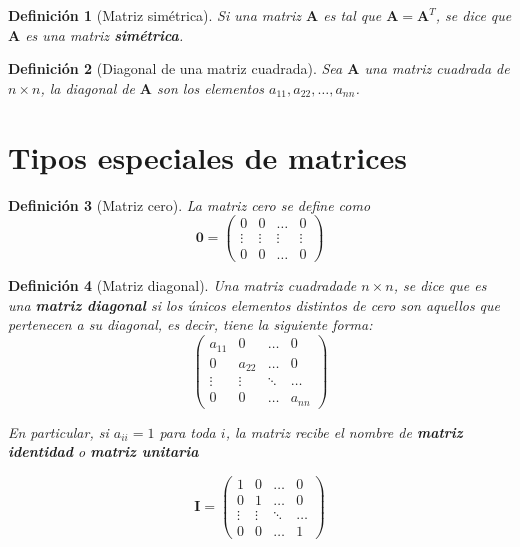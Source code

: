 \documentclass[11pt]{report}
\theoremstyle{break}
\newtheorem{definicion}{Definición}[chapter]
\theoremstyle{break}
\newcommand{\matdim}[2]{$#1 \times #2$}
\begin{document}
\begin{definicion}[Matriz simétrica]
\label{definicion:matriz-simetrica}
Si una matriz $\bm{A}$ es tal que $\bm{A} = \bm{A}^T$, se dice que $\bm{A}$ es una matriz \textbf{simétrica}.
\end{definicion}

\begin{definicion}[Diagonal de una matriz cuadrada]
\label{definicion:diagonal}
Sea $\bm{A}$ una matriz cuadrada de \matdim{n}{n}, la diagonal de $\bm{A}$ son los elementos $a_{11}, a_{22}, \ldots, a_{nn}$.
\end{definicion}

\section{Tipos especiales de matrices}
\label{seccion:Tipos-matrices}
\begin{definicion}[Matriz cero]
\label{definicion:matriz-cero}
La matriz cero se define como
$$
\bm{0} = 
\begin{pmatrix}
0 & 0 & \ldots & 0 \\
\vdots & \vdots & \vdots & \vdots \\
0 & 0 & \ldots & 0
\end{pmatrix}
$$
\end{definicion}

\begin{definicion}[Matriz diagonal]
\label{definicion:matriz-diagonal}
Una matriz cuadradade \matdim{n}{n}, se dice que es una \textbf{matriz diagonal} si los únicos elementos distintos de cero son aquellos que pertenecen a su diagonal, es decir, tiene la siguiente forma:
$$
\begin{pmatrix}
a_{11} & 0 & \ldots & 0 \\
0 & a_{22} & \ldots & 0 \\
\vdots & \vdots & \ddots & \ldots \\
0 & 0 & \ldots & a_{nn}
\end{pmatrix}
$$

En particular, si $a_{ii} = 1$ para toda $i$, la matriz recibe el nombre de \textbf{matriz identidad} o \textbf{matriz unitaria}

$$
\bm{I} = 
\begin{pmatrix}
1 & 0 & \ldots & 0 \\
0 & 1 & \ldots & 0 \\
\vdots & \vdots & \ddots & \ldots \\
0 & 0 & \ldots & 1
\end{pmatrix}
$$
\end{definicion}
\end{document}
